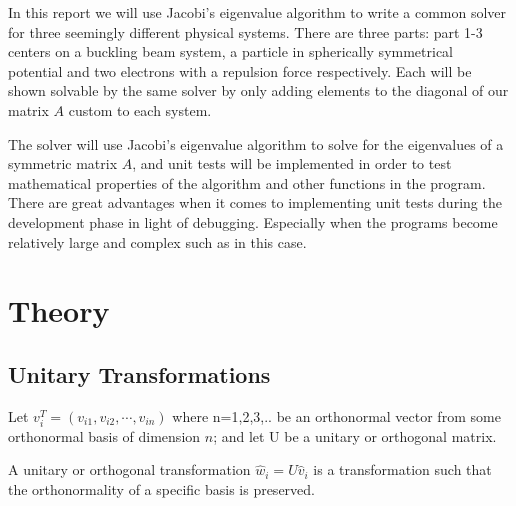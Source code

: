 \documentclass[aip,nobalancelastpage,
twocolumn,
rsi,%
 amsmath,amssymb,
 reprint,%
]{revtex4}
\begin{document}
In this report we will use Jacobi's eigenvalue algorithm to write a common solver for three seemingly different physical systems. There are three parts: part 1-3 centers on a buckling beam system, a particle in spherically symmetrical potential and two electrons with a repulsion force respectively. Each will be shown solvable by the same solver by only adding elements to the diagonal of our matrix $A$ custom to each system.\par
The solver will use Jacobi's eigenvalue algorithm to solve for the eigenvalues of a symmetric matrix $A$, and unit tests will be implemented in order to test mathematical properties of the algorithm and other functions in the program. There are great advantages when it comes to implementing unit tests during the development phase in light of debugging. Especially when the programs become relatively large and complex such as in this case.\par

\section{Theory}
\subsection{Unitary Transformations}
Let $v_i^T = (v_{i1},v_{i2},\cdots, v_{in})$ where n=1,2,3,.. be an orthonormal vector from some orthonormal basis of dimension $n$; and let U be a unitary or orthogonal matrix.\par
A unitary or orthogonal transformation $\hat{w}_i = U\hat{v}_i$ is a transformation such that the orthonormality of a specific basis is preserved. \par
\end{document}

